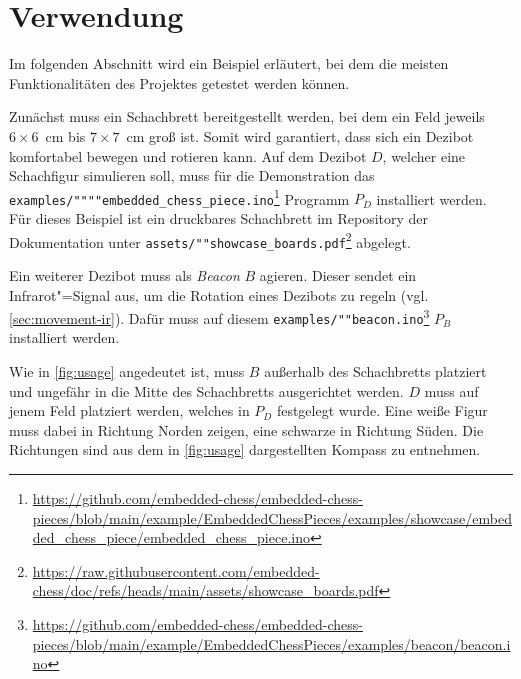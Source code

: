 
\section{Verwendung}

Im folgenden Abschnitt wird ein Beispiel erläutert, bei dem die meisten Funktionalitäten des Projektes getestet werden können.

Zunächst muss ein Schachbrett bereitgestellt werden, bei dem ein Feld jeweils \mbox{$6\times6$~cm} bis \mbox{$7\times7$~cm} groß ist. Somit wird garantiert, dass sich ein Dezibot komfortabel bewegen und rotieren kann. Auf dem Dezibot $D$, welcher eine Schachfigur simulieren soll, muss für die Demonstration das \texttt{examples/""""embedded\_\allowbreak chess\_\allowbreak piece.ino}\footnote{\url{https://github.com/embedded-chess/embedded-chess-pieces/blob/main/example/EmbeddedChessPieces/examples/showcase/embedded_chess_piece/embedded_chess_piece.ino}} Programm $P_D$ installiert werden. Für dieses Beispiel ist ein druckbares Schachbrett im Repository der Dokumentation unter \texttt{assets/""showcase\_\allowbreak boards.pdf}\footnote{\url{https://raw.githubusercontent.com/embedded-chess/doc/refs/heads/main/assets/showcase_boards.pdf}} abgelegt.

Ein weiterer Dezibot muss als \emph{Beacon} $B$ agieren. Dieser sendet ein Infrarot"=Signal aus, um die Rotation eines Dezibots zu regeln (vgl. \autoref{sec:movement-ir}). Dafür muss auf diesem \texttt{examples/""beacon.ino}\footnote{\url{https://github.com/embedded-chess/embedded-chess-pieces/blob/main/example/EmbeddedChessPieces/examples/beacon/beacon.ino}} $P_B$ installiert werden.

Wie in \autoref{fig:usage} angedeutet ist, muss $B$ außerhalb des Schachbretts platziert und ungefähr in die Mitte des Schachbretts ausgerichtet werden. $D$ muss auf jenem Feld platziert werden, welches in $P_D$ festgelegt wurde. Eine weiße Figur muss dabei in Richtung Norden zeigen, eine schwarze in Richtung Süden. Die Richtungen sind aus dem in \autoref{fig:usage} dargestellten Kompass zu entnehmen.

